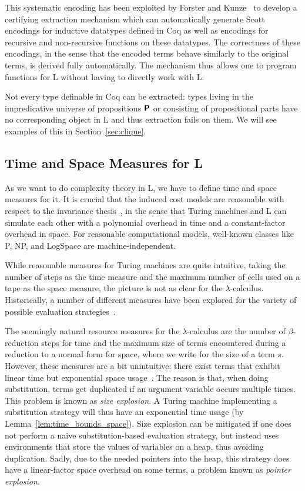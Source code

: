 This systematic encoding has been exploited by Forster and Kunze~\cite{ForsterKunze:2019:Certifying-extraction} to develop a certifying extraction mechanism which can automatically generate Scott encodings for inductive datatypes defined in Coq as well as encodings for recursive and non-recursive functions on these datatypes. The correctness of these encodings, in the sense that the encoded terms behave similarly to the original terms, is derived fully automatically.
The mechanism thus allows one to program functions for L without having to directly work with L.

\begin{remark}
  Not every type definable in Coq can be extracted: types living in the impredicative universe of propositions $\textsf{\bfseries P}$ or consisting of propositional parts have no corresponding object in L and thus extraction fails on them. 
  We will see examples of this in Section~\ref{sec:clique}. 
\end{remark}

\subsection{Time and Space Measures for L}\label{sec:time_and_space}
As we want to do complexity theory in L, we have to define time and space measures for it.
It is crucial that the induced cost models are reasonable with respect to the invariance thesis~\cite{slot_boas:invariance}, in the sense that Turing machines and L can simulate each other with a polynomial overhead in time and a constant-factor overhead in space. For reasonable computational models, well-known classes like \textsf{P}, \textsf{NP}, and \textsf{LogSpace} are machine-independent. 

While reasonable measures for Turing machines are quite intuitive, taking the number of steps as the time measure and the maximum number of cells used on a tape as the space measure, the picture is not as clear for the $\lambda$-calculus. Historically, a number of different measures have been explored for the variety of possible evaluation strategies~\cite{Accattoli:cost_models}.

The seemingly natural resource measures for the $\lambda$-calculus are the number of $\beta$-reduction steps for time and the maximum size of terms encountered during a reduction to a normal form for space, where we write  for the size of a term $s$. 
However, these measures are a bit unintuitive: there exist terms that exhibit linear time but exponential space usage~\cite{ForsterKunzeRoth:2019:wcbv-Reasonable}. The reason is that, when doing substitution, terms get duplicated if an argument variable occurs multiple times. This problem is known as \emph{size explosion}. A Turing machine implementing a substitution strategy will thus have an exponential time usage (by Lemma~\ref{lem:time_bounds_space}). 
Size explosion can be mitigated if one does not perform a naive substitution-based evaluation strategy, but instead uses environments that store the values of variables on a heap, thus avoiding duplication. Sadly, due to the needed pointers into the heap, this strategy does have a linear-factor space overhead on some terms, a problem known as \emph{pointer explosion}.

